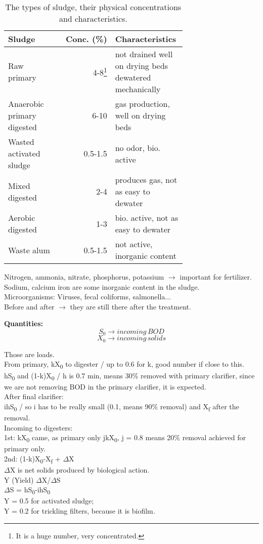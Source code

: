 \documentclass[12pt]{article}
\begin{document}
\begin{table}[h]
    \caption{The types of sludge, their physical concentrations and characteristics.}
    \label{tab:table_1}
    \centering
    \begin{tabular}{p{0.3\linewidth}rp{0.4\linewidth}}
        \toprule
        Sludge & Conc. (\%) & Characteristics \\
        \midrule
        Raw primary & 4-8\footnote{It is a huge number, very concentrated.} & not drained well on drying beds \newline dewatered mechanically\\
        Anaerobic primary digested & 6-10 & gas production, well on drying beds\\
        Wasted activated sludge & 0.5-1.5 & no odor, bio. active\\
        Mixed digested & 2-4 & produces gas, not as easy to dewater\\
        Aerobic digested & 1-3 & bio. active, not as easy to dewater\\
        Waste alum & 0.5-1.5 & not active, inorganic content\\
        \bottomrule
    \end{tabular}
\end{table}

Nitrogen, ammonia, nitrate, phosphorus, potassium $\rightarrow$ important for fertilizer.\\
Sodium, calcium iron are some inorganic content in the sludge.\\
Microorganisms: Viruses, fecal coliforms, salmonella...\\
Before and after $\rightarrow$ they are still there after the treatment.

\textbf{Quantities:}
\[S_0 \rightarrow incoming\,BOD\]
\[X_0 \rightarrow incoming\,solids\]

Those are loads.\\
From primary, kX\textsubscript{0} to digester / up to 0.6 for k, good number if close to this.\\
hS\textsubscript{0} and (1-k)X\textsubscript{0} / h is 0.7 min, means 30\% removed with primary clarifier, since we are not removing BOD in the primary clarifier, it is expected.\\
After final clarifier:\\
ihS\textsubscript{0} / so i has to be really small (0.1, means 90\% removal) and X\textsubscript{f} after the removal.\\
Incoming to digesters:\\
1st: kX\textsubscript{0} came, as primary only jkX\textsubscript{0}, j = 0.8 means 20\% removal achieved for primary only.\\
2nd: (1-k)X\textsubscript{0}-X\textsubscript{f} + $\Delta$X\\
$\Delta$X is net solids produced by biological action.\\
Y (Yield) $\Delta$X/$\Delta$S\\
$\Delta$S = hS\textsubscript{0}-ihS\textsubscript{0}\\
Y = 0.5 for activated sludge;\\
Y = 0.2 for trickling filters, because it is biofilm.\\
\end{document}
